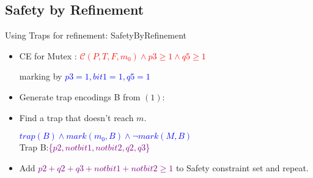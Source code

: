 \documentclass{beamer}
\begin{document}
\subsection{Safety by Refinement}
\begin{frame}{Using Traps for refinement: SafetyByRefinement}
  
  \begin{itemize}
  \item<1-> {
  CE for Mutex : \textcolor{red}{$\mathcal{C}(P,T,F,m_0)\land p3 \geq 1 \land q5 \geq 1 $} 
  \begin{center}
  marking by \textcolor{blue}{$p3=1,bit1=1,q5=1$}
  \end{center}
  }
  \item<2-> {   
Generate trap encodings B from $(1)$:
  }
  \item<3-> {
    Find a trap that doesn't reach $m$.\\
    \begin{center}
    \textcolor{blue}{$trap(B) \land mark(m_0,B) \land \neg mark(M,B)$}\\
    Trap B:\textcolor{purple}{\{$p2,notbit1,notbit2,q2,q3$\}}
    \end{center}

  }
  \item<5-> { Add \textcolor{purple}{$p2+q2+q3+notbit1+notbit2 \geq 1$} to Safety constraint set and repeat.}
 
  \end{itemize}
\end{frame}
\end{document}
